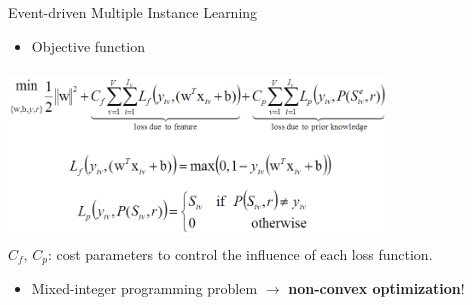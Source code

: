 \documentclass{beamer}
\begin{document}
\begin{frame}{Event-driven Multiple Instance Learning} 	
		\begin{itemize}	
			\item Objective function
		\end{itemize}	
	\begin{center}
		\includegraphics[width=10cm,height=4.5cm]{images/part4/formalization.png}
		\\
		$C_{f}$, $C_{p}$: cost parameters to control the influence of each loss function.\\
				
	\end{center}
\begin{itemize}	
	\item Mixed-integer programming problem $\rightarrow$ \textbf{non-convex optimization}!
\end{itemize}	
	
\end{frame}	
\end{document}

